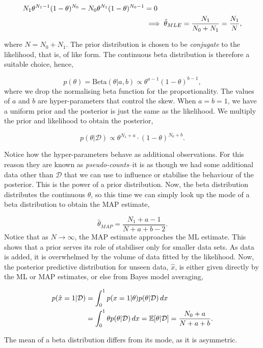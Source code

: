 \documentclass[11pt]{amsart}
\begin{document}
\begin{align}
N_1\theta^{N_1 - 1}(1 - \theta)^{N_0} - N_0\theta^{N_1}(1 - \theta)^{N_0 - 1} &= 0 \notag \\
&\implies \hat\theta_{MLE} = \frac{N_1}{N_0 + N_1} = \frac{N_1}{N}, \notag
\end{align}

where $N = N_0 + N_1$. The prior distribution is chosen to be \emph{conjugate} to the likelihood, that is, of like form. The continuous beta distribution is therefore a suitable choice, hence,

$$p(\theta) = \text{Beta}(\theta|a, b) \propto \theta^{a - 1}(1 - \theta)^{b - 1},$$ where we drop the normalising beta function for the proportionality. The values of $a$ and $b$ are hyper-parameters that control the skew. When $a = b = 1$, we have a uniform prior and the posterior is just the same as the likelihood. We multiply the prior and likelihood to obtain the posterior,

$$p(\theta|\mathcal{D}) \propto \theta^{N_1 + a}\cdot(1 - \theta)^{N_0 + b}.$$

Notice how the hyper-parameters behave as additional observations. For this reason they are known as \emph{pseudo-counts}--it is as though we had some additional data other than $\mathcal{D}$ that we can use to influence or stabilise the behaviour of the posterior. This is the power of a prior distribution. Now, the beta distribution distributes the continuous $\theta$, so this time we can simply look up the mode of a beta distribution to obtain the MAP estimate,

$$\hat\theta_{MAP} = \frac{N_1 + a - 1}{N + a + b - 2}.$$ Notice that as $N \to \infty$, the MAP estimate approaches the ML estimate. This shows that a prior serves its role of stabiliser only for smaller data sets. As data is added, it is overwhelmed by the volume of data fitted by the likelihood. Now, the posterior predictive distribution for unseen data, $\hat{x}$, is either given directly by the ML or MAP estimates, or else from Bayes model averaging,

\begin{align}
p(\hat{x} = 1|\mathcal{D}) &= \int_0^1 p(x = 1 |\theta)p(\theta|\mathcal{D})\mathop{dx} \notag \\
&= \int_0^1 \theta p(\theta|\mathcal{D})\mathop{dx} = \mathbb{E}[\theta|\mathcal{D}] = \frac{N_0 + a}{N + a + b}. \notag
\end{align}

The mean of a beta distribution differs from its mode, as it is asymmetric.
\end{document}
